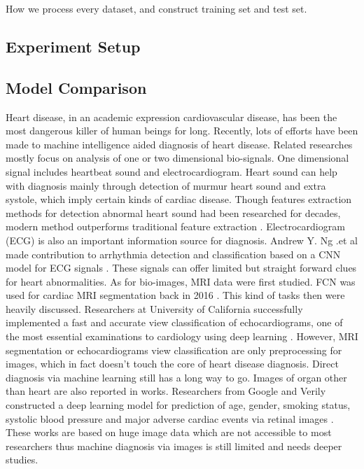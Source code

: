 \documentclass[letterpaper]{article} %
\begin{document}
How we process every dataset, and construct training set and test set.

\subsection{Experiment Setup}

\subsection{Model Comparison}

Heart disease, in an academic expression cardiovascular disease, has been the most dangerous killer of human beings for long. Recently, lots of efforts have been made to machine intelligence aided diagnosis of heart disease. Related researches mostly focus on analysis of one or two dimensional bio-signals. One dimensional signal includes heartbeat sound and electrocardiogram. Heart sound can help with diagnosis mainly through detection of murmur heart sound and extra systole, which imply certain kinds of cardiac disease. Though features extraction methods for detection abnormal heart sound had been researched for decades, modern method outperforms traditional feature extraction \cite{cite1}. Electrocardiogram (ECG) is also an important information source for diagnosis. Andrew Y. Ng .et al made contribution to arrhythmia detection and classification based on a CNN model for ECG signals \cite{cite2}. These signals can offer limited but straight forward clues for heart abnormalities. As for bio-images, MRI data were first studied. FCN was used for cardiac MRI segmentation back in 2016 \cite{cite3}. This kind of tasks then were heavily discussed. Researchers at University of California successfully implemented a fast and accurate view classification of echocardiograms, one of the most essential examinations to cardiology using deep learning \cite{cite4}. However, MRI segmentation or echocardiograms view classification are only preprocessing for images, which in fact doesn’t touch the core of heart disease diagnosis. Direct diagnosis via machine learning still has a long way to go. Images of organ other than heart are also reported in works. Researchers from Google and Verily constructed a deep learning model for prediction of age, gender, smoking status, systolic blood pressure and major adverse cardiac events via retinal images \cite{cite5}. These works are based on huge image data which are not accessible to most researchers thus machine diagnosis via images is still limited and needs deeper studies.
\end{document}
